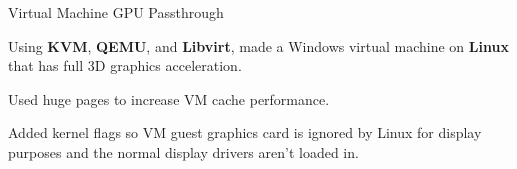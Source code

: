 


\begin{cventries}


\cventry
{} %
{Virtual Machine GPU Passthrough } %
{}%
{}%
{ %
  \begin{cvitems}
  \item{Using \textbf{KVM}, \textbf{QEMU}, and \textbf{Libvirt}, made   a Windows virtual machine on \textbf{Linux} that has full 3D graphics acceleration.}
  \item{Used huge pages to increase VM cache performance.}
  \item{Added kernel flags so VM guest graphics card is ignored by Linux for display purposes and the normal display drivers aren't loaded in.}
  \end{cvitems}
}


\end{cventries}
